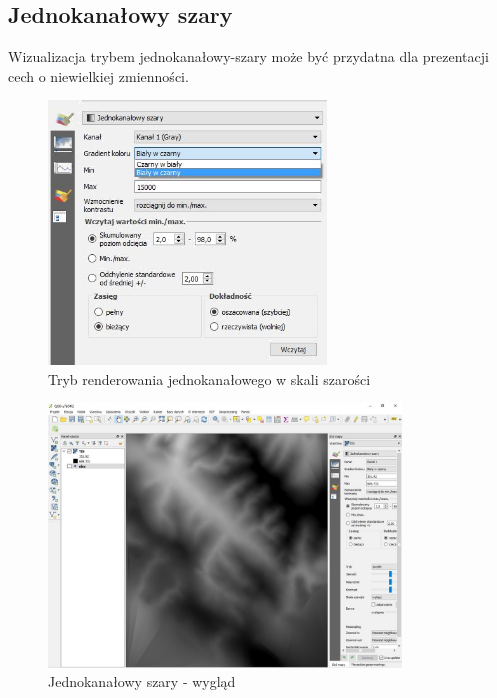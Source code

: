 \documentclass[12pt,a4paper]{book}
\begin{document}
\subsection{Jednokanałowy szary}
Wizualizacja trybem jednokanałowy-szary może być przydatna dla prezentacji cech o niewielkiej zmienności.
\begin{figure}[!ht]
	\centering
	\includegraphics[height=7cm]{007-raster-jedno.png}
	\caption{Tryb renderowania jednokanałowego w skali szarości}
\end{figure}
\begin{figure}[!ht]
	\centering
	\includegraphics[height=7cm]{007-raster-szary.jpg}
	\caption{Jednokanałowy szary - wygląd}
\end{figure}
\end{document}
